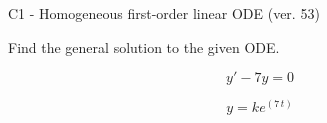 \begin{exercise}
  \begin{exerciseTitle}C1 - Homogeneous first-order linear ODE (ver. 53)\end{exerciseTitle}
  \begin{exerciseStatement}
    
Find the general solution to the given ODE.

    
\[y'-7y=0\]

  \end{exerciseStatement}
  \begin{exerciseAnswer}
    
\[y= k e^{\left(7 \, t\right)}\]

  \end{exerciseAnswer}
\end{exercise}